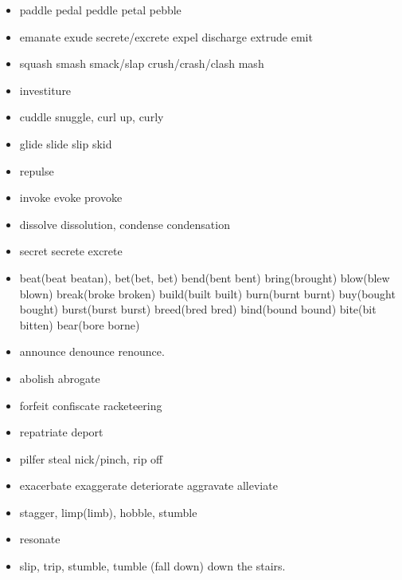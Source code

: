 \documentclass[a4paper,11pt,twoside]{book}
\begin{document}
\begin{itemize}
	\item paddle pedal peddle petal pebble
	
	\item emanate exude secrete/excrete expel discharge extrude emit
	
	\item squash smash smack/slap crush/crash/clash mash 
	
	\item investiture 
	
	\item cuddle snuggle, curl up, curly 
	
	\item glide slide slip skid 
	
	\item repulse
	
	\item invoke evoke provoke
	
	\item dissolve dissolution, condense condensation 
	
	\item secret secrete excrete
	
	\item beat(beat beatan), bet(bet, bet) bend(bent bent) bring(brought) blow(blew blown) break(broke broken) build(built built) burn(burnt burnt) buy(bought bought) burst(burst burst) breed(bred bred) bind(bound bound) 
	bite(bit bitten) bear(bore borne)
	
	\item announce denounce renounce. 
	
	\item abolish abrogate
	
	\item forfeit confiscate racketeering 
	
	\item repatriate deport
	
	\item pilfer steal nick/pinch, rip off 
	
	\item exacerbate exaggerate deteriorate aggravate alleviate 
	
	\item stagger, limp(limb), hobble, stumble 

	\item resonate
	
	\item slip, trip, stumble,  tumble (fall down) down the stairs. 
	

\end{itemize}
\end{document}
